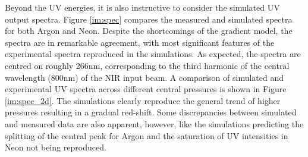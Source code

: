 \documentclass[a4paper]{jpconf}
\begin{document}
Beyond the UV energies, it is also instructive to consider the simulated UV output spectra. Figure \ref{im:spec} compares the measured and simulated spectra for both Argon and Neon. Despite the shortcomings of the gradient model, the spectra are in remarkable agreement, with most significant features of the experimental spectra reproduced in the simulations. As expected, the spectra are centred on roughly 266nm, corresponding to the third harmonic of the central wavelength (800nm) of the NIR input beam. A comparison of simulated and experimental UV spectra across different central pressures is shown in Figure \ref{im:spec_2d}. The simulations clearly reproduce the general trend of higher pressures resulting in a gradual red-shift. Some discrepancies between simulated and measured data are also apparent, however, like the simulations predicting the splitting of the central peak for Argon and the saturation of UV intensities in Neon not being reproduced. 
\end{document}
